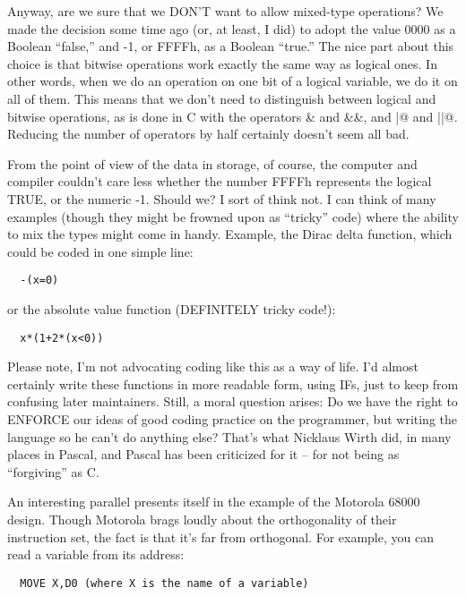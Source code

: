 Anyway, are we sure that we DON'T want to allow mixed-type operations?  We made the decision some time ago (or, at least, I did) to adopt the value 0000 as a Boolean ``false,'' and -1, or FFFFh, as a Boolean ``true.'' The nice part about this choice is that bitwise operations work exactly the same way as logical ones. In other words, when we do an operation on one bit of a logical variable, we do it on all of them. This means that we don't need to distinguish between logical and bitwise operations, as is done in C with the operators \& and \&\&, and \verb@|@ and \verb@||@. Reducing the number of operators by half certainly doesn't seem all bad.

From the point of view of the data in storage, of course, the computer and compiler couldn't care less whether the number FFFFh represents the logical TRUE, or the numeric -1. Should we?  I sort of think not. I can think of many examples (though they might be frowned upon as ``tricky'' code) where the ability to mix the types might come in handy. Example, the Dirac delta function, which could be coded in one simple line:

\begin{verbatim}
  -(x=0)
\end{verbatim}

or the absolute value function (DEFINITELY tricky code!):

\begin{verbatim}
  x*(1+2*(x<0))
\end{verbatim}

Please note, I'm not advocating coding like this as a way of life. I'd almost certainly write these functions in more readable form, using IFs, just to keep from confusing later maintainers. Still, a moral question arises:  Do we have the right to ENFORCE our ideas of good coding practice on the programmer, but writing the language so he can't do anything else?  That's what Nicklaus Wirth did, in many places in Pascal, and Pascal has been criticized for it -- for not being as ``forgiving'' as C.

An interesting parallel presents itself in the example of the Motorola 68000 design. Though Motorola brags loudly about the orthogonality of their instruction set, the fact is that it's far from orthogonal. For example, you can read a variable from its address:

\begin{verbatim}
  MOVE X,D0 (where X is the name of a variable)
\end{verbatim}

